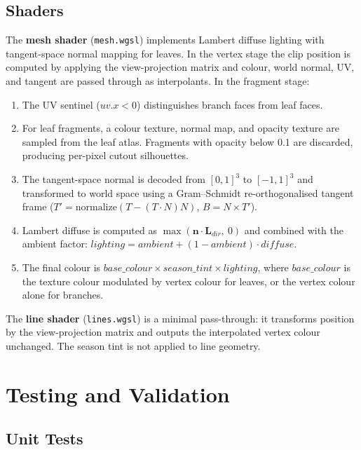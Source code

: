 \subsection{Shaders}
\label{sec:shaders}

The \textbf{mesh shader} (\texttt{mesh.wgsl}) implements Lambert diffuse lighting with tangent-space normal
mapping for leaves. In the vertex stage the clip position is computed by applying the view-projection matrix
and colour, world normal, UV, and tangent are passed through as interpolants. In the fragment stage:

\begin{enumerate}
\item The UV sentinel ($\mathit{uv}.x < 0$) distinguishes branch faces from leaf faces.
\item For leaf fragments, a colour texture, normal map, and opacity texture are sampled from the leaf atlas.
  Fragments with opacity below 0.1 are discarded, producing per-pixel cutout silhouettes.
\item The tangent-space normal is decoded from $[0,1]^3$ to $[-1,1]^3$ and transformed to world space using a
  Gram--Schmidt re-orthogonalised tangent frame ($T' = \text{normalize}(T - (T \cdot N)N)$, $B = N \times T'$).
\item Lambert diffuse is computed as $\max(\mathbf{n} \cdot \mathbf{L}_\mathit{dir},\ 0)$ and combined with
  the ambient factor: $\mathit{lighting} = \mathit{ambient} + (1 - \mathit{ambient}) \cdot \mathit{diffuse}$.
\item The final colour is $\mathit{base\_colour} \times \mathit{season\_tint} \times \mathit{lighting}$,
  where $\mathit{base\_colour}$ is the texture colour modulated by vertex colour for leaves, or the vertex
  colour alone for branches.
\end{enumerate}

The \textbf{line shader} (\texttt{lines.wgsl}) is a minimal pass-through: it transforms position by the
view-projection matrix and outputs the interpolated vertex colour unchanged. The season tint is not applied
to line geometry.

\section{Testing and Validation}
\label{sec:testing}

\subsection{Unit Tests}

